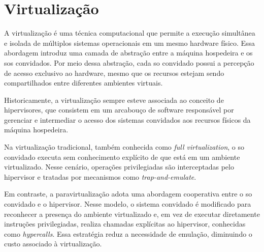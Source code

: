\section{Virtualização}

A virtualização é uma técnica computacional que permite a execução simultânea e isolada de múltiplos sistemas operacionais em um mesmo hardware físico. Essa abordagem introduz uma camada de abstração entre a máquina
hospedeira e os \glspl{so} convidados. Por meio dessa abstração, cada \gls{so} convidado possui a percepção de acesso exclusivo ao hardware, mesmo que os recursos estejam sendo compartilhados entre
diferentes ambientes virtuais.

Historicamente, a virtualização sempre esteve associada ao conceito de hipervisores, que consistem em um arcabouço de software responsável por gerenciar e intermediar o acesso dos sistemas convidados aos recursos físicos
da máquina hospedeira.

Na virtualização tradicional, também conhecida como \textit{full virtualization}, o \gls{so} convidado executa sem conhecimento explícito de que está em um ambiente virtualizado.
Nesse cenário, operações privilegiadas são interceptadas pelo hipervisor e tratadas por mecanismos como \textit{trap-and-emulate}.

Em contraste, a paravirtualização adota uma abordagem cooperativa entre o \gls{so} convidado e o hipervisor. Nesse modelo, o sistema convidado é modificado para reconhecer a presença do
ambiente virtualizado e, em vez de executar diretamente instruções privilegiadas, realiza chamadas explícitas ao hipervisor, conhecidas como \textit{hypercalls}. Essa estratégia reduz a necessidade de
emulação, diminuindo o custo associado à virtualização.


%



